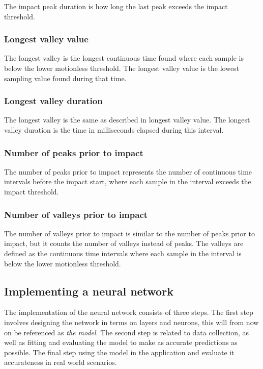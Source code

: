 \documentclass[12pt, a4paper, onecolumn]{article}
\begin{document}
	The impact peak duration is how long the last peak exceeds the impact threshold.
	
	\subsubsection{Longest valley value}
	
	The longest valley is the longest continuous time found where each sample is below the lower motionless threshold. The longest valley value is the lowest sampling value found during that time.
	
	\subsubsection{Longest valley duration}
	
	The longest valley is the same as described in longest valley value. The longest valley duration is the time in milliseconds elapsed during this interval.
	
	\subsubsection{Number of peaks prior to impact}
	
	The number of peaks prior to impact represents the number of continuous time intervals before the impact start, where each sample in the interval exceeds the impact threshold.
	
	\subsubsection{Number of valleys prior to impact}
	
	The number of valleys prior to impact is similar to the number of peaks prior to impact, but it counts the number of valleys instead of peaks. The valleys are defined as the continuous time intervals where each sample in the interval is below the lower motionless threshold.
	
	\subsection{Implementing a neural network}
	The implementation of the neural network consists of three steps. The first step involves designing the network in terms on layers and neurons, this will from now on be referenced as \textit{the model}. The second step is related to data collection, as well as fitting and evaluating the model to make as accurate predictions as possible. The final step using the model in the application and evaluate it accurateness in real world scenarios. 
	
\end{document}

